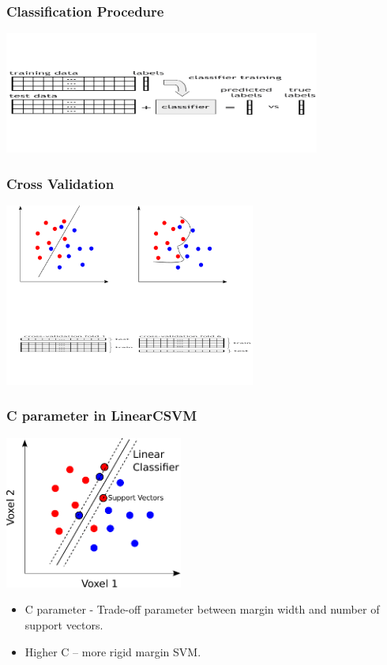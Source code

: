 \documentclass{beamer}
\begin{document}
  \begin{frame}
    \frametitle{Classification Procedure}
        \begin{center}
            \includegraphics[height=4cm]{../pictures/classification_procedure}
        \end{center}
    \end{frame}
    
  \begin{frame}
    \frametitle{Cross Validation}
        \begin{center}
            \includegraphics[height=6cm]{../pictures/cross_validation}
        \end{center}
    \end{frame}    

  \begin{frame}
    \frametitle{C parameter in LinearCSVM}
        \begin{center}
            \includegraphics[height=5cm]{../pictures/margin_support_vectors}
            \begin{itemize}
             \item C parameter - Trade-off parameter between margin width and number of support vectors.
             \item Higher C – more rigid margin SVM.
            \end{itemize}  
        \end{center}     
    \end{frame}   
\end{document}
